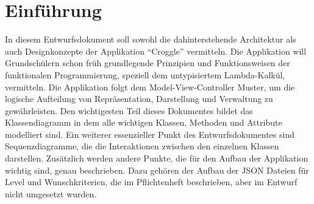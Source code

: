 \chapter{Einführung}

In diesem Entwurfsdokument soll sowohl die dahinterstehende Architektur als auch Designkonzepte der Applikation "`Croggle"' vermitteln.
Die Applikation will Grundschülern schon früh grundlegende Prinzipien und Funktionsweisen der funktionalen Programmierung, speziell dem untypisiertem Lambda-Kalkül, vermitteln.
Die Applikation folgt dem Model-View-Controller Muster, um die logische Aufteilung von Repräsentation, Darstellung und Verwaltung zu gewährleisten.
Den wichtigesten Teil dieses Dokumentes bildet das Klassendiagramm in dem alle wichtigen Klassen, Methoden und Attribute modelliert sind.
Ein weiterer essenzieller Punkt des Entwurfsdokumentes sind Sequenzdiagramme, die die Interaktionen zwischen den einzelnen Klassen darstellen.
Zusätzlich werden andere Punkte, die für den Aufbau der Applikation wichtig sind, genau beschrieben. Dazu gehören der Aufbau der JSON Dateien für Level und Wunschkriterien, die im Pflichtenheft beschrieben, aber im Entwurf nicht umgesetzt wurden.
